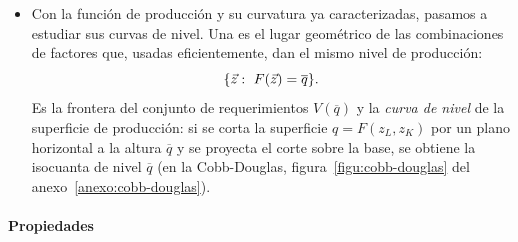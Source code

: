 \documentclass[11pt]{article}
\begin{document}
\begin{itemize}
\item Con la función de producción y su curvatura ya caracterizadas, pasamos a estudiar sus curvas de nivel. Una  es el lugar geométrico de las combinaciones de factores que, usadas eficientemente, dan el mismo nivel de producción:
  \begin{equation}
  \{\vect{z}:\ F(\vect{z})=\overline{q}\}. \label{eq:isocuanta}
  \end{equation}
  Es la frontera del conjunto de requerimientos $V(\overline{q})$ y la \emph{curva de nivel} de la superficie de producción: si se corta la superficie $q=F(z_L,z_K)$ por un plano horizontal a la altura $\overline{q}$ y se proyecta el corte sobre la base, se obtiene la isocuanta de nivel $\overline{q}$ (en la Cobb-Douglas, figura~\ref{figu:cobb-douglas} del anexo~\ref{anexo:cobb-douglas}).
\end{itemize}

\paragraph{Propiedades}
\end{document}

